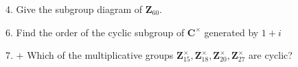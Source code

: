 \newpage%
\begin{mdframed}[style=darkQuesion]
4. Give the subgroup diagram of $\mathbf{Z}_{60}$.
\end{mdframed}
\begin{mdframed}[style=darkAnswer,frametitle={Joe Starr}]
  
\end{mdframed}
\newpage
\begin{mdframed}[style=darkQuesion]
6. Find the order of the cyclic subgroup of $\mathbf{C}^{\times}$ generated by $1+i$
\end{mdframed}
\begin{mdframed}[style=darkAnswer,frametitle={Joe Starr}]
  
\end{mdframed}
\newpage
\begin{mdframed}[style=darkQuesion]
7. $+$ Which of the multiplicative groups $\mathbf{Z}_{15}^{\times}, \mathbf{Z}_{18}^{\times}, \mathbf{Z}_{20}^{\times}, \mathbf{Z}_{27}^{\times}$ are cyclic?
\end{mdframed}
\begin{mdframed}[style=darkAnswer,frametitle={Joe Starr}]
  
\end{mdframed}
\newpage
